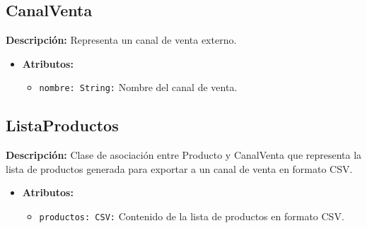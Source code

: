 \documentclass[12pt.a4paper]{article}
\begin{document}
\subsection{CanalVenta}
\textbf{Descripción:} Representa un canal de venta externo.
    \begin{itemize}
        \item {\textbf{Atributos:}}
        \begin{itemize}
            \item \texttt{nombre: String:} Nombre del canal de venta.
        \end{itemize}
    \end{itemize}

\subsection{ListaProductos}
\textbf{Descripción:} Clase de asociación entre Producto y CanalVenta que representa la lista de productos generada para exportar a un canal de venta en formato CSV.
    \begin{itemize}
        \item {\textbf{Atributos:}}
        \begin{itemize}
            \item \texttt{productos: CSV:} Contenido de la lista de productos en formato CSV.
        \end{itemize}
    \end{itemize}    
\end{document}
